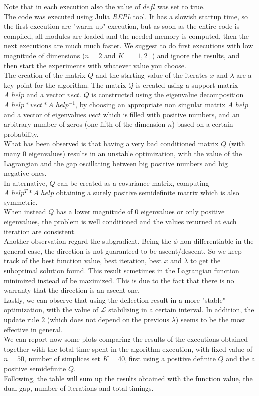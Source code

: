 \documentclass[notitlepage]{article}
\begin{document}
Note that in each execution also the value of $defl$ was set to true.\\
The code was executed using Julia \textit{REPL} tool. It has a slowish startup time, so the first execution are "warm-up" execution, but as soon as the entire code is compiled, all modules are loaded and the needed memory is computed, 
then the next executions are much much faster. We suggest to do first executions with low magnitude of dimensions ($n=2$ and $K=\left[1,2\right]$) and ignore the results, and then start the experiments with whatever value you choose.\\
The creation of the matrix $Q$ and the starting value of the iterates $x$ and $\lambda$ are a key point for the algorithm. The matrix $Q$ is created using a support matrix $A\_help$ and a vector $vect$. $Q$ is 
constructed using the eigenvalue decomposition $A\_help * vect * A\_help^{-1}$, by choosing an appropriate non singular matrix $A\_help$ and a vector of eigenvalues $vect$ which is filled with positive numbers,
and an arbitrary number of zeros (one fifth of the dimension $n$) based on a certain probability.\\
What has been observed is that having a very bad conditioned matrix $Q$ (with many $0$ eigenvalues) results in an unstable optimization, with the value of the Lagrangian and the gap oscillating between big positive 
numbers and big negative ones.\\
In alternative, $Q$ can be created as a covariance matrix, computing $A\_help^T * A\_help$ obtaining a surely positive semidefinite matrix which is also symmetric.\\
When instead $Q$ has a lower magnitude of $0$ eigenvalues or only positive eigenvalues, the problem is well conditioned and the values returned at each iteration are consistent.\\
Another observation regard the subgradient. Being the $\phi$ non differentiable in the general case, the direction is not guaranteed to be ascent/descent. So we keep track of the best function value, best iteration, best $x$ 
and $\lambda$ to get the suboptimal solution found. This result sometimes in the Lagrangian function minimized instead of be maximized. This is due to the fact that there is no warranty that the direction is an ascent one.\\
Lastly, we can observe that using the deflection result in a more "stable" optimization, with the value of $\mathcal{L}$ stabilizing in a certain interval. In addition, the update rule $2$ (which does not depend on the previous $\lambda$) 
seems to be the most effective in general.\\[1em]
We can report now some plots comparing the results of the executions obtained together with the total time spent in the algorithm execution, with fixed value of $n=50$, number of simplices set $K=40$, first using a positive definite $Q$
and the a positive semidefinite $Q$.\\
Following, the table will sum up the results obtained with the function value, the dual gap, number of iterations and total timings.
\end{document}
